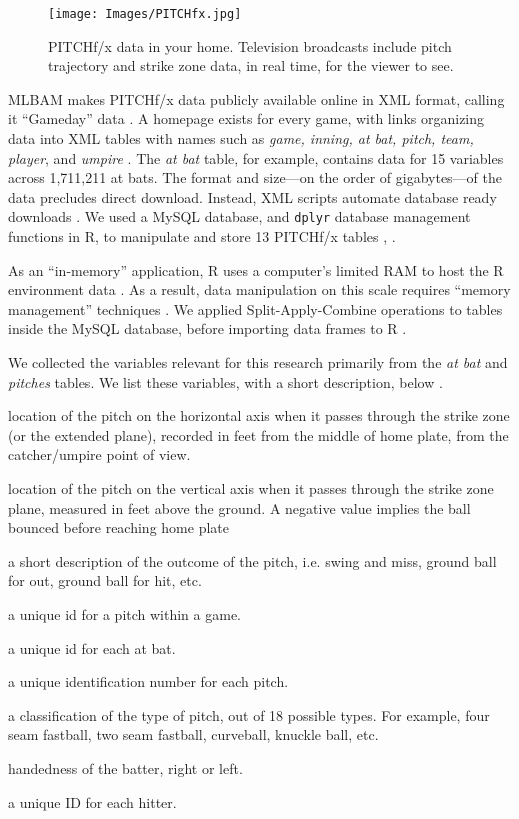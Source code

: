         \begin{figure}[H]
      	\centering
      	\texttt{[image: Images/PITCHfx.jpg]} 
      	\caption{PITCHf/x\textsuperscript{\textregistered} data in your home. Television broadcasts include pitch trajectory and strike zone data, in real time, for the viewer to see.}
      	\end{figure} 
MLBAM\textsuperscript{\textregistered} makes PITCHf/x\textsuperscript{\textregistered} data publicly available online in XML format, calling it ``Gameday'' data \citep{Sievert2014}. A homepage exists for every game, with links organizing data into XML tables with names such as {\it game, inning, at bat, pitch, team, player}, and {\it umpire} \citep{Sievert2014}. The {\it at bat} table, for example, contains data for 15 variables across 1,711,211 at bats. The format and size---on the order of gigabytes---of the data precludes direct download. Instead, XML scripts automate database ready downloads \citep{Adler2006}. We used a MySQL database, and \verb|dplyr| database management functions in R, to manipulate and store 13 PITCHf/x\textsuperscript{\textregistered} tables \citep{Tahaghoghi2006}, \citep{Wickham2016}. 

As an ``in-memory'' application, R uses a computer's limited RAM to host the R environment data \citep{Smith2013}. As a result, data manipulation on this scale requires ``memory management'' techniques \citep{Wickham2014}.  We applied Split-Apply-Combine operations to tables inside the MySQL database, before importing data frames to R \citep{Wickham2011}.

We collected the variables relevant for this research primarily from the {\it at bat} and {\it pitches} tables. We list these variables, with a short description, below \citep{Fast2007}.
  \begin{description}[leftmargin=1.5cm, style=nextline]
  \item[px] location of the pitch on the horizontal axis when it passes through the strike zone (or the extended plane), recorded in feet from the middle of home plate, from the catcher/umpire point of view.
  \item[pz] location of the pitch on the vertical axis when it passes through the strike zone plane, measured in feet above the ground. A negative value implies the ball bounced before reaching home plate
  \item[des] a short description of the outcome of the pitch, i.e. swing and miss, ground ball for out, ground ball for hit, etc.
  \item[id] a unique id for a pitch within a game.
  \item[ab\_id] a unique id for each at bat.
  \item[pitch\_id] a unique identification number for each pitch.
  \item[pitch\_type] a classification of the type of pitch, out of 18 possible types. For example, four seam fastball, two seam fastball, curveball, knuckle ball, etc.
  \item[stand] handedness of the batter, right or left.
  \item[batter] a unique ID for each hitter.
\end{description}

